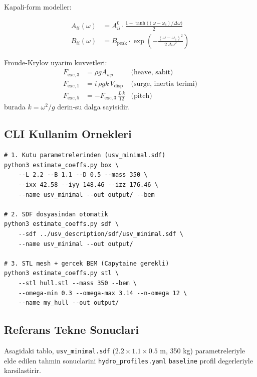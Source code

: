 \documentclass[12pt,a4paper]{article}
\begin{document}
Kapali-form modeller:

\begin{align}
  A_{ii}(\omega) &= A_{ii}^0 \cdot
    \frac{1 - \tanh\!\bigl((\omega-\omega_c)/\Delta\omega\bigr)}{2}
  \label{eq:a_empirical}\\[4pt]
  B_{ii}(\omega) &= B_{\text{peak}} \cdot
    \exp\!\left(-\frac{(\omega-\omega_c)^2}{2\,\Delta\omega^2}\right)
  \label{eq:b_empirical}
\end{align}

Froude-Krylov uyarim kuvvetleri:
\begin{align}
  F_{\text{exc},3} &= \rho g A_{wp}
  &\text{(heave, sabit)}\\
  F_{\text{exc},1} &= i\,\rho g k\,V_{\text{disp}}
  &\text{(surge, inertia terimi)}\\
  F_{\text{exc},5} &= -F_{\text{exc},3}\,\frac{L\,k}{12}
  &\text{(pitch)}
  \label{eq:fexc_empirical}
\end{align}
burada $k = \omega^2/g$ derin-su dalga sayisidir.

\subsection{CLI Kullanim Ornekleri}

\begin{lstlisting}
# 1. Kutu parametrelerinden (usv_minimal.sdf)
python3 estimate_coeffs.py box \
    --L 2.2 --B 1.1 --D 0.5 --mass 350 \
    --ixx 42.58 --iyy 148.46 --izz 176.46 \
    --name usv_minimal --out output/ --bem

# 2. SDF dosyasindan otomatik
python3 estimate_coeffs.py sdf \
    --sdf ../usv_description/sdf/usv_minimal.sdf \
    --name usv_minimal --out output/

# 3. STL mesh + gercek BEM (Capytaine gerekli)
python3 estimate_coeffs.py stl \
    --stl hull.stl --mass 350 --bem \
    --omega-min 0.3 --omega-max 3.14 --n-omega 12 \
    --name my_hull --out output/
\end{lstlisting}

\subsection{Referans Tekne Sonuclari}

Asagidaki tablo, \texttt{usv\_minimal.sdf} ($2.2\times1.1\times0.5$ m,
350 kg) parametreleriyle elde edilen tahmin sonuclarini
\texttt{hydro\_profiles.yaml} \texttt{baseline} profil degerleriyle
karsilastirir.
\end{document}
